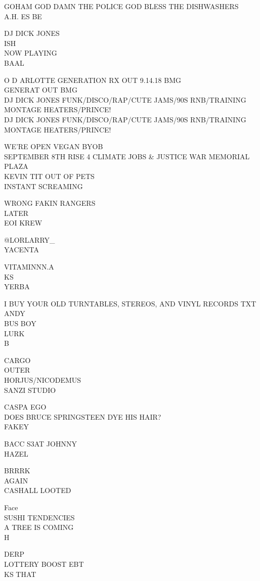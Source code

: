 \documentclass[10pt,letterpaper]{article}
\begin{document}
GOHAM GOD DAMN THE POLICE GOD BLESS THE DISHWASHERS\\
A.H. ES BE

DJ DICK JONES\\
ISH\\
NOW PLAYING\\
BAAL

O D ARLOTTE GENERATION RX OUT 9.14.18 BMG\\
GENERAT OUT BMG\\
DJ DICK JONES FUNK/DISCO/RAP/CUTE JAMS/90S RNB/TRAINING MONTAGE HEATERS/PRINCE!\\
DJ DICK JONES FUNK/DISCO/RAP/CUTE JAMS/90S RNB/TRAINING MONTAGE HEATERS/PRINCE!

WE'RE OPEN VEGAN BYOB\\
SEPTEMBER 8TH RISE 4 CLIMATE JOBS \& JUSTICE WAR MEMORIAL PLAZA\\
KEVIN TIT OUT OF PETS\\
INSTANT SCREAMING

WRONG FAKIN RANGERS\\
LATER\\
EOI KREW

@LORLARRY\_\\
YACENTA

VITAMINNN.A\\
KS\\
YERBA

I BUY YOUR OLD TURNTABLES, STEREOS, AND VINYL RECORDS TXT ANDY\\
BUS BOY\\
LURK\\
B

CARGO\\
OUTER\\
HORJUS/NICODEMUS\\
SANZI STUDIO

CASPA EGO\\
DOES BRUCE SPRINGSTEEN DYE HIS HAIR?\\
FAKEY

BACC S3AT JOHNNY\\
HAZEL

BRRRK\\
AGAIN\\
CASHALL LOOTED

Face\\
SUSHI TENDENCIES\\
A TREE IS COMING\\
H

DERP\\
LOTTERY BOOST EBT\\
KS THAT
\end{document}
